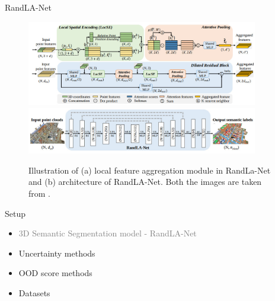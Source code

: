 \documentclass[aspectratio=169]{beamer}
\begin{document}
\begin{frame}{RandLA-Net}
    \begin{figure}
        \centering
        \includegraphics[width = 0.9\textwidth, height=0.37\textheight]{images/randlanet_dires_block.jpg}
        \includegraphics[width = 0.9\textwidth, height=0.37\textheight]{images/randlanet_model.jpg}
        \caption{Illustration of (a) local feature aggregation module in RandLa-Net and (b) architecture of
        RandLA-Net. Both the images are taken from \cite{Hu_2020_CVPR_Randla}.}
        \label{fig:randla_model}
    \end{figure}
\end{frame}
\begin{frame}[noframenumbering]{Setup}
    \begin{itemize}
        
        \item \textcolor{gray}{3D Semantic Segmentation model - RandLA-Net}
        \item Uncertainty methods
        \item OOD score methods
        \item Datasets
    \end{itemize}
\end{frame}
\end{document}
